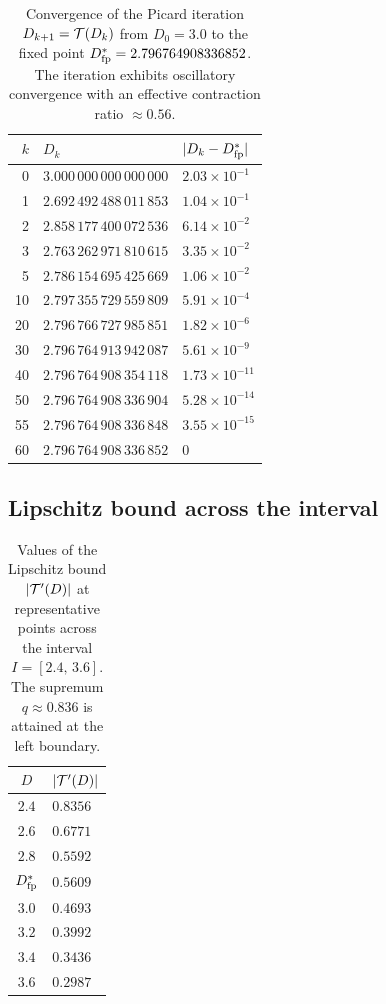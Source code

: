\documentclass[amsmath,amssymb,aps,prd,twocolumn,superscriptaddress,nofootinbib]{revtex4-2}
\begin{document}
\begin{table}[h]
\caption{Convergence of the Picard iteration $D_{k+1} = \mathcal{T}(D_k)$
from $D_0 = 3.0$ to the fixed point
$D^{*}_{\mathrm{fp}} = 2.796764908336852$.  The iteration exhibits
oscillatory convergence with an effective contraction ratio
$\approx 0.56$.}
\label{tab:convergence}
\begin{ruledtabular}
\begin{tabular}{rll}
$k$ & $D_k$ & $\lvert D_k - D^{*}_{\mathrm{fp}}\rvert$ \\
\midrule
  0  & $3.000\,000\,000\,000\,000$ & $2.03 \times 10^{-1}$  \\
  1  & $2.692\,492\,488\,011\,853$ & $1.04 \times 10^{-1}$  \\
  2  & $2.858\,177\,400\,072\,536$ & $6.14 \times 10^{-2}$  \\
  3  & $2.763\,262\,971\,810\,615$ & $3.35 \times 10^{-2}$  \\
  5  & $2.786\,154\,695\,425\,669$ & $1.06 \times 10^{-2}$  \\
 10  & $2.797\,355\,729\,559\,809$ & $5.91 \times 10^{-4}$  \\
 20  & $2.796\,766\,727\,985\,851$ & $1.82 \times 10^{-6}$  \\
 30  & $2.796\,764\,913\,942\,087$ & $5.61 \times 10^{-9}$  \\
 40  & $2.796\,764\,908\,354\,118$ & $1.73 \times 10^{-11}$ \\
 50  & $2.796\,764\,908\,336\,904$ & $5.28 \times 10^{-14}$ \\
 55  & $2.796\,764\,908\,336\,848$ & $3.55 \times 10^{-15}$ \\
 60  & $2.796\,764\,908\,336\,852$ & $0$                    \\
\end{tabular}
\end{ruledtabular}
\end{table}

\subsection{Lipschitz bound across the interval}

\begin{table}[h]
\caption{Values of the Lipschitz bound $\lvert\mathcal{T}'(D)\rvert$ at
representative points across the interval $I = [2.4,\,3.6]$.
The supremum $q \approx 0.836$ is attained at the left boundary.}
\label{tab:lipschitz}
\begin{ruledtabular}
\begin{tabular}{cl}
$D$   & $\lvert\mathcal{T}'(D)\rvert$ \\
\midrule
$2.4$ & $0.8356$ \\
$2.6$ & $0.6771$ \\
$2.8$ & $0.5592$ \\
$D^{*}_{\mathrm{fp}}$ & $0.5609$ \\
$3.0$ & $0.4693$ \\
$3.2$ & $0.3992$ \\
$3.4$ & $0.3436$ \\
$3.6$ & $0.2987$ \\
\end{tabular}
\end{ruledtabular}
\end{table}
\end{document}
